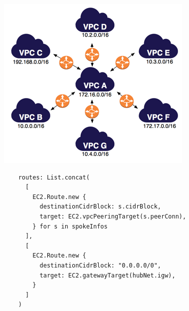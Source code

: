 \documentclass[aspectratio=169,20pt]{beamer}
\begin{document}
\begin{frame}{}
    \begin{center}
    \includegraphics[height=0.8\paperheight]{images/one-to-many-vpcs-diagram.png}
    \end{center}
\end{frame}

\begin{frame}[fragile]{}
    \begin{lstlisting}
    routes: List.concat(
      [
        EC2.Route.new {
          destinationCidrBlock: s.cidrBlock,
          target: EC2.vpcPeeringTarget(s.peerConn),
        } for s in spokeInfos
      ],
      [
        EC2.Route.new {
          destinationCidrBlock: "0.0.0.0/0",
          target: EC2.gatewayTarget(hubNet.igw),
        }
      ]
    )
    \end{lstlisting}
\end{frame}
\end{document}

